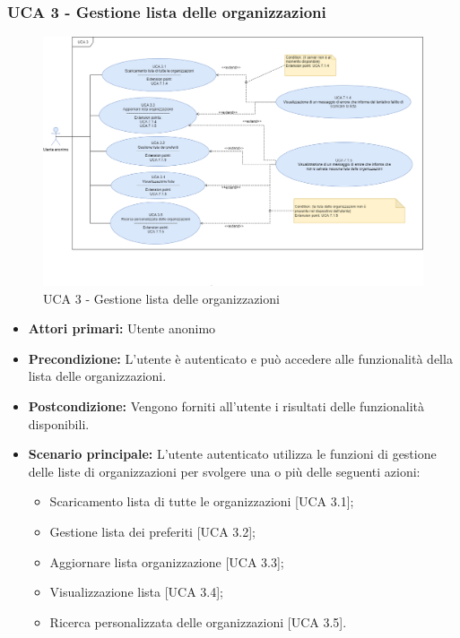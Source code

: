 \newpage

\subsubsection{UCA 3 - Gestione lista delle organizzazioni}%
\begin{figure}[h]
	\centering
	\includegraphics[scale=0.33]{sezioni/UseCase/Immagini/UCA3.png}
	\caption{UCA 3 - Gestione lista delle organizzazioni}
\end{figure}

\begin{itemize}
\item \textbf{Attori primari:} Utente anonimo
\item \textbf{Precondizione:} L'utente è autenticato e può accedere alle funzionalità della lista delle organizzazioni.
\item \textbf{Postcondizione:} Vengono forniti all'utente i risultati delle funzionalità disponibili.
\item \textbf{Scenario principale:} L'utente autenticato utilizza le funzioni di gestione delle liste di organizzazioni per svolgere una o più delle seguenti azioni:
	\begin{itemize}
		\item Scaricamento lista di tutte le organizzazioni [UCA 3.1];
		\item Gestione lista dei preferiti [UCA 3.2];
		\item Aggiornare lista organizzazione [UCA 3.3];
		\item Visualizzazione lista [UCA 3.4];
		\item Ricerca personalizzata delle organizzazioni [UCA 3.5].
	\end{itemize}
\end{itemize}



